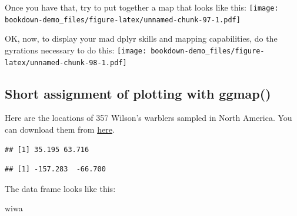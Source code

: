\documentclass[]{book}
\newenvironment{Shaded}{\begin{snugshade}}{\end{snugshade}}
\newcommand{\KeywordTok}[1]{\textcolor[rgb]{0.13,0.29,0.53}{\textbf{{#1}}}}
\newcommand{\StringTok}[1]{\textcolor[rgb]{0.31,0.60,0.02}{{#1}}}
\newcommand{\CommentTok}[1]{\textcolor[rgb]{0.56,0.35,0.01}{\textit{{#1}}}}
\newcommand{\NormalTok}[1]{{#1}}
\theoremstyle{definition}
\theoremstyle{definition}
\theoremstyle{remark}
\begin{document}
Once you have that, try to put together a map that looks like this:
\texttt{[image: bookdown-demo\_files/figure-latex/unnamed-chunk-97-1.pdf]}

OK, now, to display your mad dplyr skills and mapping capabilities, do
the gyrations necessary to do this:
\texttt{[image: bookdown-demo\_files/figure-latex/unnamed-chunk-98-1.pdf]}

\subsection{Short assignment of plotting with
ggmap()}\label{short-assignment-of-plotting-with-ggmap}

Here are the locations of 357 Wilson's warblers sampled in North
America. You can download them from
\href{https://www.dropbox.com/s/fiq6zj0qsmj0dqa/breeding_wiwa_isotopes.rds?dl=1}{here}.

\begin{Shaded}
\end{Shaded}

\begin{verbatim}
## [1] 35.195 63.716
\end{verbatim}

\begin{Shaded}
\end{Shaded}

\begin{verbatim}
## [1] -157.283  -66.700
\end{verbatim}

The data frame looks like this:

\begin{Shaded}
\begin{Highlighting}[]
\NormalTok{wiwa}
\end{Highlighting}
\end{Shaded}
\end{document}
